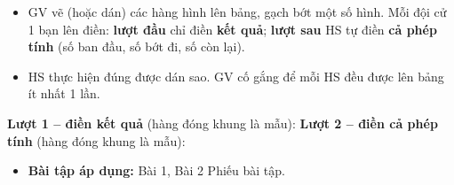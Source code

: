 \documentclass[../main.tex]{subfiles}
\begin{document}
\begin{itemize}
    \item[-] GV vẽ (hoặc dán) các hàng hình lên bảng, gạch bớt một số hình. Mỗi đội cử 1 bạn lên điền: \textbf{lượt đầu} chỉ điền \textbf{kết quả}; \textbf{lượt sau} HS tự điền \textbf{cả phép tính} (số ban đầu, số bớt đi, số còn lại).
    \item[-] HS thực hiện đúng được dán sao. GV cố gắng để mỗi HS đều được lên bảng ít nhất 1 lần.
\end{itemize}
\GPcanchotrong{5cm}\noindent\textbf{Lượt 1 -- điền kết quả} (hàng đóng khung là mẫu):
\GPcanchotrong{5cm}\noindent\textbf{Lượt 2 -- điền cả phép tính} (hàng đóng khung là mẫu):
\begin{itemize}
    \item[-] \textbf{Bài tập áp dụng:} Bài 1, Bài 2 Phiếu bài tập.
\end{itemize}

\end{document}

